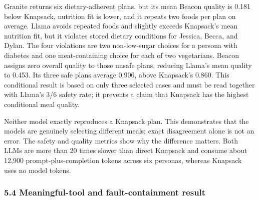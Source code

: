 \documentclass[
  10pt,
  letterpaper,
]{article}
\begin{document}
Granite returns six dietary-adherent plans, but its mean Beacon quality
is 0.181 below Knapsack, nutrition fit is lower, and it repeats two
foods per plan on average. Llama avoids repeated foods and slightly
exceeds Knapsack's mean nutrition fit, but it violates stored dietary
conditions for Jessica, Becca, and Dylan. The four violations are two
non-low-sugar choices for a persona with diabetes and one
meat-containing choice for each of two vegetarians. Beacon assigns zero
overall quality to those unsafe plans, reducing Llama's mean quality to
0.453. Its three safe plans average 0.906, above Knapsack's 0.860. This
conditional result is based on only three selected cases and must be
read together with Llama's 3/6 safety rate; it prevents a claim that
Knapsack has the highest conditional meal quality.

Neither model exactly reproduces a Knapsack plan. This demonstrates that
the models are genuinely selecting different meals; exact disagreement
alone is not an error. The safety and quality metrics show why the
difference matters. Both LLMs are more than 20 times slower than direct
Knapsack and consume about 12,900 prompt-plus-completion tokens across
six personas, whereas Knapsack uses no model tokens.

\subsubsection{5.4 Meaningful-tool and fault-containment
result}\label{meaningful-tool-and-fault-containment-result}
\end{document}
